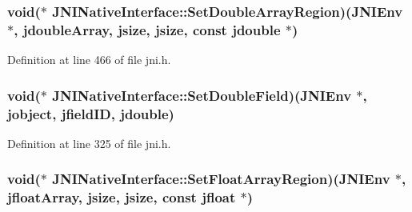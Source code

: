 \hypertarget{struct_j_n_i_native_interface_a1bf53bfc97764e908ac7160691aec569}{
\subsubsection[{Set\-Double\-Array\-Region}]{\setlength{\rightskip}{0pt plus 5cm}void($\ast$ J\-N\-I\-Native\-Interface\-::\-Set\-Double\-Array\-Region)({\bf J\-N\-I\-Env} $\ast$, {\bf jdouble\-Array}, {\bf jsize}, {\bf jsize}, const {\bf jdouble} $\ast$)}}\label{struct_j_n_i_native_interface_a1bf53bfc97764e908ac7160691aec569}


Definition at line 466 of file jni.\-h.

\hypertarget{struct_j_n_i_native_interface_a5595e75d5e5e65d925ed21fbb97d4062}{
\subsubsection[{Set\-Double\-Field}]{\setlength{\rightskip}{0pt plus 5cm}void($\ast$ J\-N\-I\-Native\-Interface\-::\-Set\-Double\-Field)({\bf J\-N\-I\-Env} $\ast$, {\bf jobject}, {\bf jfield\-I\-D}, {\bf jdouble})}}\label{struct_j_n_i_native_interface_a5595e75d5e5e65d925ed21fbb97d4062}


Definition at line 325 of file jni.\-h.

\hypertarget{struct_j_n_i_native_interface_a45307d2f2bf5d81d5016d191ab521599}{
\subsubsection[{Set\-Float\-Array\-Region}]{\setlength{\rightskip}{0pt plus 5cm}void($\ast$ J\-N\-I\-Native\-Interface\-::\-Set\-Float\-Array\-Region)({\bf J\-N\-I\-Env} $\ast$, {\bf jfloat\-Array}, {\bf jsize}, {\bf jsize}, const {\bf jfloat} $\ast$)}}\label{struct_j_n_i_native_interface_a45307d2f2bf5d81d5016d191ab521599}


